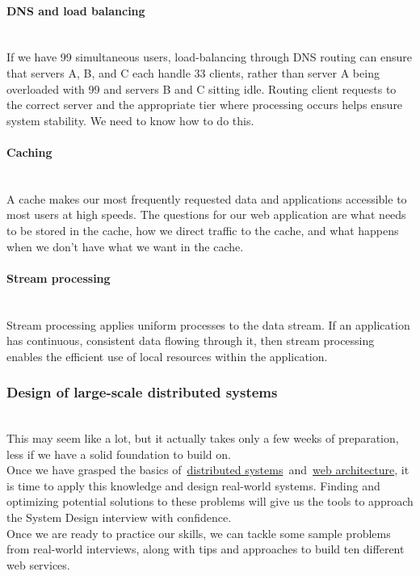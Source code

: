 \paragraph{DNS and load balancing}\label{PTl0G6dWkKcv-Ks6peIw3}
\\
If we have 99 simultaneous users, load-balancing through DNS routing can ensure that servers A, B, and C each handle 33 clients, rather than server A being overloaded with 99 and servers B and C sitting idle. Routing client requests to the correct server and the appropriate tier where processing occurs helps ensure system stability. We need to know how to do this.
\\
\paragraph{Caching}\label{cpBhNp2aqtJUSmgEpwdSn}
\\
A cache makes our most frequently requested data and applications accessible to most users at high speeds. The questions for our web application are what needs to be stored in the cache, how we direct traffic to the cache, and what happens when we don't have what we want in the cache.
\\
\paragraph{Stream processing}\label{wrfDbCM4l11idT-zgzPoK}
\\
Stream processing applies uniform processes to the data stream. If an application has continuous, consistent data flowing through it, then stream processing enables the efficient use of local resources within the application.

\subsubsection{Design of large-scale distributed systems}\label{e4_-kYk8BH6abWM0eQ6CR}
\\
This may seem like a lot, but it actually takes only a few weeks of preparation, less if we have a solid foundation to build on.
\\
Once we have grasped the basics of~\href{https://www.educative.io/courses/distributed-systems-practitioners}{distributed systems}~and~\href{https://www.educative.io/courses/software-architecture-in-applications}{web architecture}, it is time to apply this knowledge and design real-world systems. Finding and optimizing potential solutions to these problems will give us the tools to approach the System Design interview with confidence.
\\
Once we are ready to practice our skills, we can tackle some sample problems from real-world interviews, along with tips and approaches to build ten different web services.

